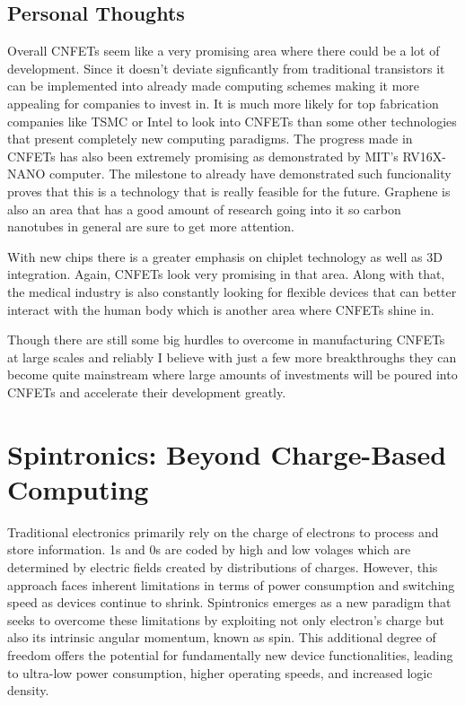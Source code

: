 \documentclass[sigconf,authordraft]{acmart}
\begin{document}
\subsection{Personal Thoughts}
Overall CNFETs seem like a very promising area where there could be 
a lot of development. Since it doesn't deviate signficantly from 
traditional transistors it can be implemented into already made 
computing schemes making it more appealing for companies to invest 
in. It is much more likely for top fabrication companies like 
TSMC or Intel to look into CNFETs than some other technologies
that present completely new computing paradigms. The progress made in 
CNFETs has also been extremely promising as demonstrated by MIT's 
RV16X-NANO computer. The milestone to already have demonstrated 
such funcionality proves that this is a technology that is really 
feasible for the future. Graphene is also an area that has a good 
amount of research going into it so carbon nanotubes in general 
are sure to get more attention. 

With new chips there is a greater emphasis on chiplet technology 
as well as 3D integration. Again, CNFETs look very promising in that
area. Along with that, the medical industry is also constantly looking 
for flexible devices that can better interact with the human body 
which is another area where CNFETs shine in. 

Though there are still some big hurdles to overcome in manufacturing 
CNFETs at large scales and reliably I believe with just a few more 
breakthroughs they can become quite mainstream where large amounts 
of investments will be poured into CNFETs and accelerate their development 
greatly. 

\section{Spintronics: Beyond Charge-Based Computing}
Traditional electronics primarily rely on the charge of electrons 
to process and store information. 1s and 0s are coded by high and 
low volages which are determined by electric fields created by
distributions of charges. However, this approach faces inherent 
limitations in terms of power consumption and switching speed as 
devices continue to shrink. Spintronics emerges as a new paradigm 
that seeks to overcome these limitations by exploiting not only electron's 
charge but also its intrinsic angular momentum, known as spin. 
This additional degree of freedom offers the potential for 
fundamentally new device functionalities, leading to 
ultra-low power consumption, higher operating speeds, and increased 
logic density.
\end{document}
